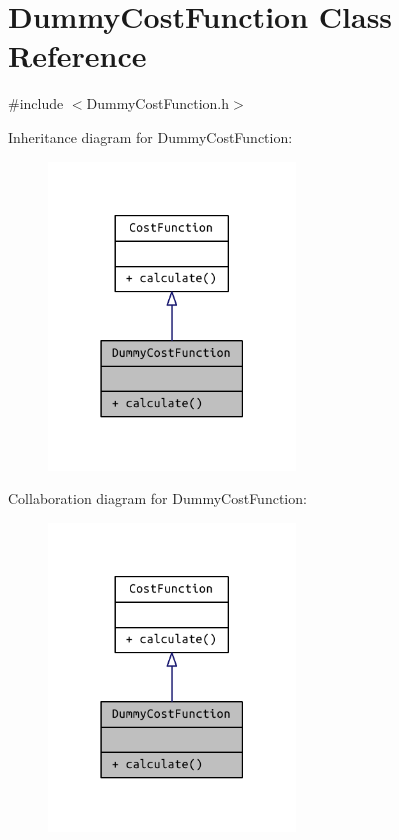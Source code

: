 \hypertarget{class_dummy_cost_function}{}\section{Dummy\+Cost\+Function Class Reference}
\label{class_dummy_cost_function}


{\ttfamily \#include $<$Dummy\+Cost\+Function.\+h$>$}



Inheritance diagram for Dummy\+Cost\+Function\+:
\nopagebreak
\begin{figure}[H]
\begin{center}
\leavevmode
\includegraphics[width=186pt]{class_dummy_cost_function__inherit__graph}
\end{center}
\end{figure}


Collaboration diagram for Dummy\+Cost\+Function\+:
\nopagebreak
\begin{figure}[H]
\begin{center}
\leavevmode
\includegraphics[width=186pt]{class_dummy_cost_function__coll__graph}
\end{center}
\end{figure}

